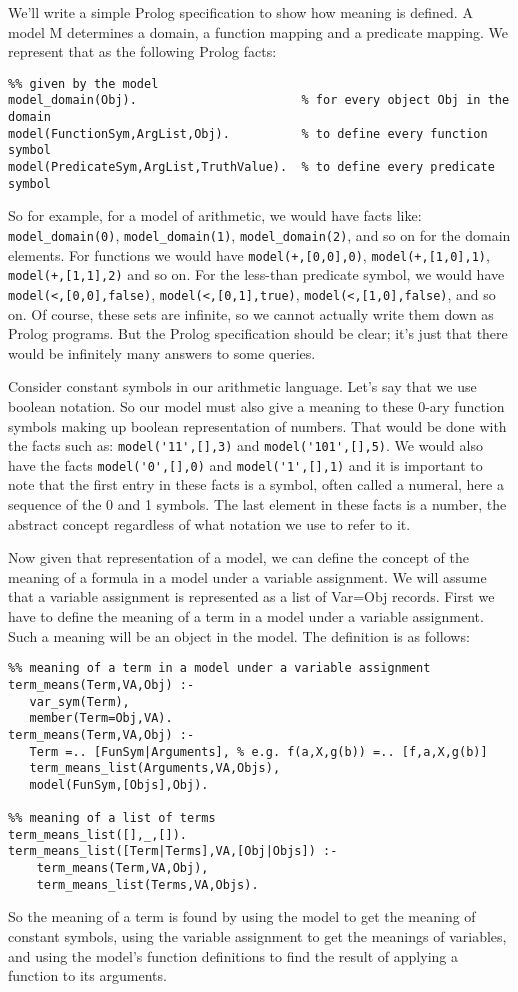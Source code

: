 We'll write a simple Prolog specification to show how meaning is defined.
A model M determines a domain, a function mapping and a predicate
mapping.  We represent that as the following Prolog facts:
\begin{verbatim}
%% given by the model
model_domain(Obj).                       % for every object Obj in the domain
model(FunctionSym,ArgList,Obj).          % to define every function symbol
model(PredicateSym,ArgList,TruthValue).  % to define every predicate symbol
\end{verbatim}
So for example, for a model of arithmetic, we would have facts like:
\verb|model_domain(0)|, \verb|model_domain(1)|,
\verb|model_domain(2)|,  and so on for the domain elements.  For
functions we would have \verb|model(+,[0,0],0)|,
\verb|model(+,[1,0],1)|, \verb|model(+,[1,1],2)| and so on.  For the
less-than predicate symbol, we would have \verb|model(<,[0,0],false)|,
\verb|model(<,[0,1],true)|, \verb|model(<,[1,0],false)|, and so on.
Of course, these sets are infinite, so we cannot actually write them
down as Prolog programs.  But the Prolog specification should be
clear; it's just that there would be infinitely many answers to some
queries.

Consider constant symbols in our arithmetic language.  Let's say that
we use boolean notation. So our model must also give a
meaning to these 0-ary function symbols making up boolean
representation of numbers.  That would be
done with the facts such as: \verb|model('11',[],3)| and
\verb|model('101',[],5)|.  We would also have the facts
\verb|model('0',[],0)| and \verb|model('1',[],1)| and it is important to
note that the first entry in these facts is a symbol, often called a
numeral, here a sequence of the 0 and 1 symbols.  The last element in
these facts is a number, the abstract concept regardless of what
notation we use to refer to it.

Now given that representation of a model, we can define the concept of
the meaning of a formula in a model under a variable assignment.  We
will assume that a variable assignment is represented as a list of
Var=Obj records.  First we have to define the meaning of a term in a
model under a variable assignment.  Such a meaning will be an object
in the model.  The definition is as follows:
\begin{verbatim}
%% meaning of a term in a model under a variable assignment
term_means(Term,VA,Obj) :- 
   var_sym(Term), 
   member(Term=Obj,VA).
term_means(Term,VA,Obj) :- 
   Term =.. [FunSym|Arguments], % e.g. f(a,X,g(b)) =.. [f,a,X,g(b)] 
   term_means_list(Arguments,VA,Objs),
   model(FunSym,[Objs],Obj).

%% meaning of a list of terms
term_means_list([],_,[]).
term_means_list([Term|Terms],VA,[Obj|Objs]) :-
    term_means(Term,VA,Obj),
    term_means_list(Terms,VA,Objs).
\end{verbatim}
So the meaning of a term is found by using the model to get the
meaning of constant symbols, using the variable assignment to get the
meanings of variables, and using the model's function definitions to
find the result of applying a function to its arguments.

